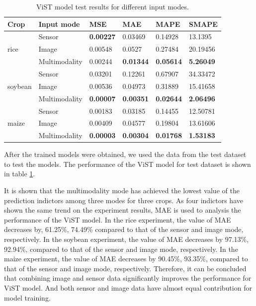 \documentclass[acmsmall,manuscript, screen, review]{acmart}
\begin{document}
\begin{table}[htbp]
  \centering
  \caption{ViST model test results for different input modes.}
    \begin{tabular}{llllll}
    \toprule
    Crop  & \multicolumn{1}{l}{Input mode} & MSE   & \multicolumn{1}{l}{MAE} & MAPE  & SMAPE \\
    \midrule
    \multirow{3}[1]{*}{rice} & Sensor & \textbf{0.00227} & 0.03469 & 0.14928 & 13.1395 \\
          & Image & 0.00548 & 0.0527 & 0.27484 & 20.19456 \\
          & Multimodality & 0.00244 & \textbf{0.01344} & \textbf{0.05614} & \textbf{5.26049} \\
          \midrule
    \multirow{3}[0]{*}{soybean} & Sensor & 0.03201 & 0.12261 & 0.67907 & 34.33472 \\
          & Image & 0.00536 & 0.04973 & 0.31889 & 15.41658 \\
          & Multimodality & \textbf{0.00007} & \textbf{0.00351} & \textbf{0.02644} & \textbf{2.06496} \\
          \midrule
    \multirow{3}[1]{*}{maize} & Sensor & 0.00183 & 0.03185 & 0.14455 & 12.50781 \\
          & Image & 0.00409 & 0.04577 & 0.19804 & 13.61606 \\
          & Multimodality & \textbf{0.00003} & \textbf{0.00304} & \textbf{0.01768} & \textbf{1.53183} \\
    \bottomrule
    \end{tabular}%
  \label{tab:vist_model_test_results}%
\end{table}%


After the trained models were obtained, we used the data from the test dataset to test the models. The performance of the ViST model for test dataset is shown in table \ref{tab:vist_model_test_results}.

It is shown that the multimodality mode has achieved the lowest value of the prediction indictors among three modes for three crops. As four indictors have shown the same trend on the experiment results, MAE is used to analysis the performance of the ViST model. In the rice experiment, the value of MAE decreases by, 61.25\%, 74.49\% compared to that of the sensor and image mode, respectively. In the soybean experiment, the value of MAE decreases by 97.13\%, 92.94\%, compared to that of the sensor and image mode, respectively. In the maize experiment, the value of MAE decreases by 90.45\%, 93.35\%, compared to that of the sensor and image mode, respectively. Therefore, it can be concluded that combining image and sensor data significantly improves the performance for ViST model. And both sensor and image data have almost equal contribution for model training.
\end{document}
